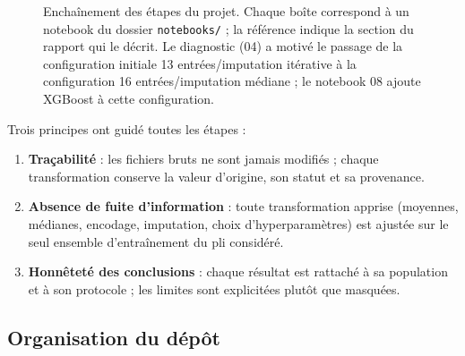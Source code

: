 \begin{figure}[htbp]
\caption{Enchaînement des étapes du projet. Chaque boîte correspond à un notebook
du dossier \texttt{notebooks/} ; la référence indique la section du rapport qui
le décrit. Le diagnostic (04) a motivé le passage de la configuration initiale
13 entrées/imputation itérative à la configuration 16 entrées/imputation médiane ;
le notebook 08 ajoute XGBoost à cette configuration.}
\label{fig:demarche}
\end{figure}

Trois principes ont guidé toutes les étapes :
\begin{enumerate}
  \item \textbf{Traçabilité} : les fichiers bruts ne sont jamais modifiés ; chaque transformation conserve la valeur d'origine, son statut et sa provenance.
  \item \textbf{Absence de fuite d'information} : toute transformation apprise (moyennes, médianes, encodage, imputation, choix d'hyperparamètres) est ajustée sur le seul ensemble d'entraînement du pli considéré.
  \item \textbf{Honnêteté des conclusions} : chaque résultat est rattaché à sa population et à son protocole ; les limites sont explicitées plutôt que masquées.
\end{enumerate}

\subsection{Organisation du dépôt}


